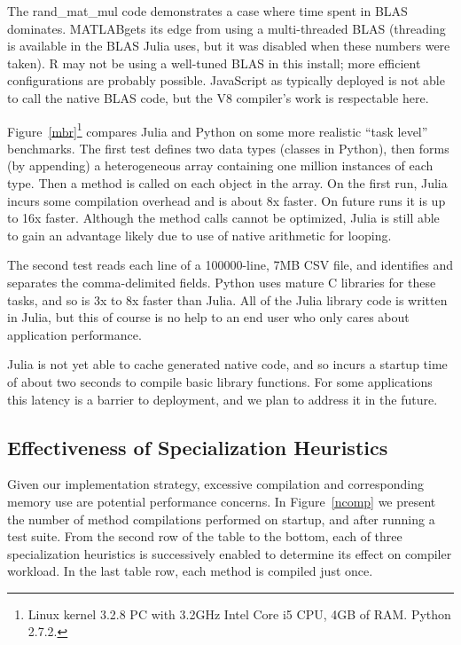\documentclass[9pt]{sigplanconf}
\newcommand{\Matlab}{MATLAB\textsuperscript{\tiny\textregistered}}
\begin{document}
The rand\_mat\_mul code demonstrates a case where time spent in BLAS \cite{blas}
dominates. \Matlab gets its edge from using a
multi-threaded BLAS (threading is available in the BLAS Julia uses,
but it was disabled when these numbers were taken). R may not be using
a well-tuned BLAS in this install; more efficient configurations are
probably possible.
JavaScript as typically deployed is not able to call the native BLAS code,
but the V8 compiler's work is respectable here.

Figure~\ref{mbr}\footnote{
Linux kernel 3.2.8 PC with 3.2GHz Intel Core i5 CPU, 4GB of RAM.
Python 2.7.2.} compares Julia and Python on some
more realistic ``task level'' benchmarks. The first test defines two
data types (classes in Python), then forms (by appending) a heterogeneous
array containing one million instances of each type. Then a method is called
on each object in the array. On the first run, Julia incurs some compilation
overhead and is about 8x faster. On future runs it is up to 16x faster.
Although the method calls cannot be optimized, Julia is still able to
gain an advantage likely due to use of native arithmetic for looping.

The second test reads each line of a 100000-line, 7MB CSV file, and
identifies and separates the comma-delimited fields. Python uses mature
C libraries for these tasks, and so is 3x to 8x faster than Julia. All of
the Julia library code is written in Julia, but this of course is no help
to an end user who only cares about application performance.

Julia is not yet able to cache generated native code, and so incurs a
startup time of about two seconds to compile basic library functions.
For some applications this latency is a barrier to deployment, and we plan
to address it in the future.


\subsection{Effectiveness of Specialization Heuristics}

Given our implementation strategy, excessive compilation and corresponding
memory use are potential performance concerns. In Figure~\ref{ncomp}
we present the number of method compilations performed on startup, and
after running a test suite. From the second row of the table to the bottom,
each of three specialization heuristics is successively enabled to
determine its effect on compiler workload. In the last table row, each
method is compiled just once.
\end{document}
